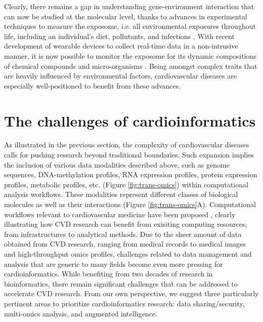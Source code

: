 \documentclass[letter]{bioinfo}
\begin{document}
	Clearly, there remains a gap in understanding gene-environment interaction that can now be studied at the molecular level, thanks to advances in experimental techniques to measure the exposome, i.e. all environmental exposures throughout life, including an individual's diet, pollutants, and infections \citep{Wild:2005:Complementing}. With recent development of wearable devices to collect real-time data in a non-intrusive manner, it is now possible to monitor the exposome for its dynamic compositions of chemical compounds and micro-organisms \citep{Warth:2017:ExposomeScale, Jiang:2018:Dynamic}. Being amongst complex traits that are heavily influenced by environmental factors, cardiovascular diseases are especially well-positioned to benefit from these advances.
	
	\section*{The challenges of cardioinformatics}
	As illustrated in the previous section, the complexity of cardiovascular diseases calls for pushing research beyond traditional boundaries.
	Such expansion implies the inclusion of various data modalities described above, such as genome sequences, DNA-methylation profiles, RNA expression profiles, protein expression profiles, metabolic profiles, etc. (Figure \ref{fig:trans-omics}) within computational analysis workflows. These modalities represent different classes of biological molecules as well as their interactions (Figure \ref{fig:trans-omics}A). Computational workflows relevant to cardiovascular medicine have been proposed \citep{Ping:2018:Biomedical}, clearly illustrating how CVD research can benefit from exisiting computing resources, from infrastructures to analytical methods. Due to the sheer amount of data obtained from CVD research, ranging from medical records to medical images and high-throughput omics profiles, challenges related to data management and analysis that are generic to many fields become even more pressing for cardioinformatics. While benefiting from two decades of research in bioinformatics, there remain significant challenges that can be addressed to accelerate CVD research. From our own perspective, we suggest three particularly pertinent areas to prioritize cardioinformatics research: data sharing/security, multi-omics analysis, and augmented intelligence.
	
	
\end{document}
